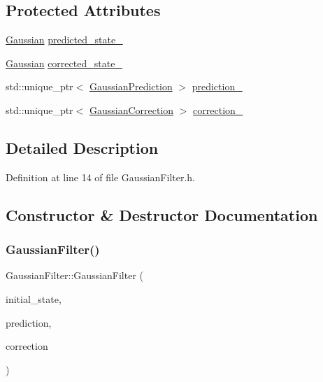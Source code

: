 \subsection*{Protected Attributes}
\begin{DoxyCompactItemize}
\item 
\mbox{\hyperlink{classbfl_1_1Gaussian}{Gaussian}} \mbox{\hyperlink{classbfl_1_1GaussianFilter_a2a1d0665d3bec12be129b33d06098ca4}{predicted\+\_\+state\+\_\+}}
\item 
\mbox{\hyperlink{classbfl_1_1Gaussian}{Gaussian}} \mbox{\hyperlink{classbfl_1_1GaussianFilter_a7b653083e75369f0e0d0436ed4ddcbca}{corrected\+\_\+state\+\_\+}}
\item 
std\+::unique\+\_\+ptr$<$ \mbox{\hyperlink{classbfl_1_1GaussianPrediction}{Gaussian\+Prediction}} $>$ \mbox{\hyperlink{classbfl_1_1GaussianFilter_a407bf3e926711e771304a8aaeb4db863}{prediction\+\_\+}}
\item 
std\+::unique\+\_\+ptr$<$ \mbox{\hyperlink{classbfl_1_1GaussianCorrection}{Gaussian\+Correction}} $>$ \mbox{\hyperlink{classbfl_1_1GaussianFilter_aec8fd5bd317c76fc133296b6e544d0b0}{correction\+\_\+}}
\end{DoxyCompactItemize}


\subsection{Detailed Description}


Definition at line 14 of file Gaussian\+Filter.\+h.



\subsection{Constructor \& Destructor Documentation}
\mbox{\label{classbfl_1_1GaussianFilter_a480ea4178578324e2805f93884b718f1}} 
\subsubsection{\texorpdfstring{Gaussian\+Filter()}{GaussianFilter()}\hspace{0.1cm}{\footnotesize\ttfamily [1/2]}}
{\footnotesize\ttfamily Gaussian\+Filter\+::\+Gaussian\+Filter (\begin{DoxyParamCaption}\item[{\mbox{\hyperlink{classbfl_1_1Gaussian}{Gaussian}} \&}]{initial\+\_\+state,  }\item[{std\+::unique\+\_\+ptr$<$ \mbox{\hyperlink{classbfl_1_1GaussianPrediction}{Gaussian\+Prediction}} $>$}]{prediction,  }\item[{std\+::unique\+\_\+ptr$<$ \mbox{\hyperlink{classbfl_1_1GaussianCorrection}{Gaussian\+Correction}} $>$}]{correction }\end{DoxyParamCaption})\hspace{0.3cm}{\ttfamily [noexcept]}}



